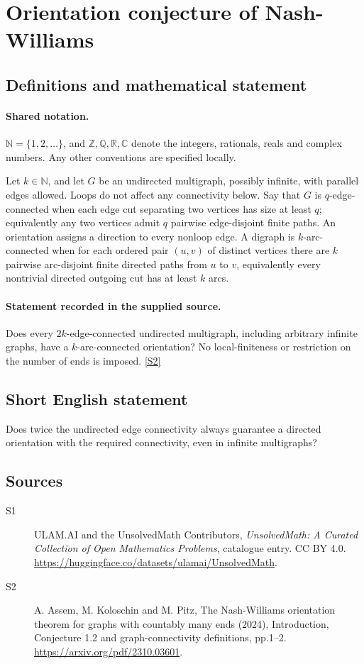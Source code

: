 \documentclass[11pt]{article}
\newcommand{\sref}[2]{\hyperlink{source:#1:#2}{[S#2]}}
\begin{document}
\section{Orientation conjecture of Nash-Williams}\label{statement}

\subsection{Definitions and mathematical statement}

\paragraph{Shared notation.}$\mathbb N=\{1,2,\ldots\}$, and $\mathbb Z,\mathbb Q,\mathbb R,\mathbb C$ denote the integers, rationals, reals and complex numbers. Any other conventions are specified locally.


Let $k\in\mathbb N$, and let $G$ be an undirected multigraph, possibly infinite, with parallel edges allowed. Loops do not affect any connectivity below. Say that $G$ is $q$-edge-connected when each edge cut separating two vertices has size at least $q$; equivalently any two vertices admit $q$ pairwise edge-disjoint finite paths. An orientation assigns a direction to every nonloop edge. A digraph is $k$-arc-connected when for each ordered pair $(u,v)$ of distinct vertices there are $k$ pairwise arc-disjoint finite directed paths from $u$ to $v$, equivalently every nontrivial directed outgoing cut has at least $k$ arcs.
\paragraph{Statement recorded in the supplied source.}
Does every $2k$-edge-connected undirected multigraph, including arbitrary infinite graphs, have a $k$-arc-connected orientation? No local-finiteness or restriction on the number of ends is imposed. \sref{statement}{2}
\subsection{Short English statement}
Does twice the undirected edge connectivity always guarantee a directed orientation with the required connectivity, even in infinite multigraphs?
\subsection{Sources}
\begin{description}
\item[\hypertarget{source:statement:1}{S1}] ULAM.AI and the UnsolvedMath Contributors, \emph{UnsolvedMath: A Curated Collection of Open Mathematics Problems}, catalogue entry. CC BY 4.0. \url{https://huggingface.co/datasets/ulamai/UnsolvedMath}.
\item[\hypertarget{source:statement:2}{S2}] A. Assem, M. Koloschin and M. Pitz, The Nash-Williams orientation theorem for graphs with countably many ends (2024), Introduction, Conjecture 1.2 and graph-connectivity definitions, pp.1--2. \url{https://arxiv.org/pdf/2310.03601}.
\end{description}
\label{end:statement}
\end{document}
